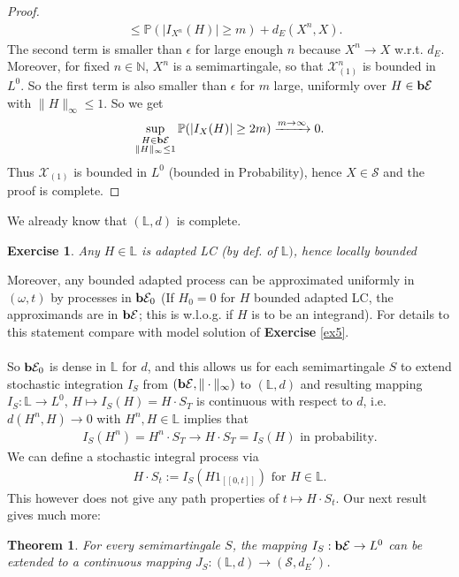 \documentclass[12pt,a4paper, twoside]{article}
\newtheorem{thm}{Theorem}[section]
\newtheorem{exe}{Exercise}[section]
\theoremstyle{definition}
\newcommand{\PP}{\mathbb{P}} %
\newcommand{\simple}{\textbf{\text{b}}\mathcal{E}}
\begin{document}
\begin{proof}
\begin{align*}
& \leq \PP(|I_{X^n}(H)| \geq m) + d_E(X^n,X).
\end{align*}
The second term is smaller than $\epsilon$ for large enough $n$ because $X^n \to X$ w.r.t. $d_E$. Moreover, for fixed $n \in \mathbb{N}$, $X^n$ is a semimartingale, so that $ \mathcal{X}_{(1)}^n$ is bounded in $L^0$. So the first term is also smaller than $\epsilon$ for $m$ large, uniformly over $H \in \simple$ with $\|H\|_\infty \leq 1$. So we get 
\begin{align*}
\sup_{\substack{H \in \simple \\ \|H\|_\infty \leq 1}} \PP( |I_X(H)| \geq 2m) \xrightarrow{m \to \infty} 0. 
\end{align*}
Thus $\mathcal{X}_{(1)}$ is bounded in $L^0$ (bounded in Probability), hence $X \in \mathcal{S}$ and the proof is complete. 
\end{proof}
We already know that $( \mathbb{L},d)$ is complete. 
\begin{exe} \label{ex6} Any $H \in \mathbb{L}$ is adapted LC (by def. of $\mathbb{L})$, hence locally bounded
\end{exe}
Moreover, any bounded adapted process can be approximated uniformly in $( \omega, t)$ by processes in $\simple_0$ (If $H_0=0$ for $H $ bounded adapted LC, the approximands are in $\simple$; this is w.l.o.g. if $H$ is to be an integrand). For details to this statement compare with model solution of \textbf{Exercise} \ref{ex5}. \\
\\
So $\simple_0$ is dense in $\mathbb{L}$ for $d$, and this allows us for each semimartingale $S$ to extend stochastic integration $I_S$ from $( \simple , \| \cdot \|_\infty)$ to $( \mathbb{L},d)$ and resulting mapping $I_S: \mathbb{L} \to L^0$, $H \mapsto I_S(H)=H \cdot S_T$ is continuous with respect to $d$, i.e. $d(H^n,  H) \to 0$ with $H^n, H \in \mathbb{L}$ implies that 
\begin{align*}
I_S(H^n)= H^n \cdot S_T \to H \cdot S_T = I_S(H) \text{ in probability.}
\end{align*}
We can define a stochastic integral process via  
\begin{align*}
H \cdot S_t := I_S(H 1_{[\![ 0,t]\!]}) \text{ for } H \in \mathbb{L}.
\end{align*}
This however does not give any path properties of $t \mapsto H \cdot S_t$. Our next result gives much more:
\begin{thm}\label{T35} For every semimartingale $S$, the mapping $I_S: \simple \to L^0$ can be extended to a continuous mapping $J_S:( \mathbb{L},d) \to ( \mathcal{S}, d_E')$. 
\end{thm}
\end{document}
